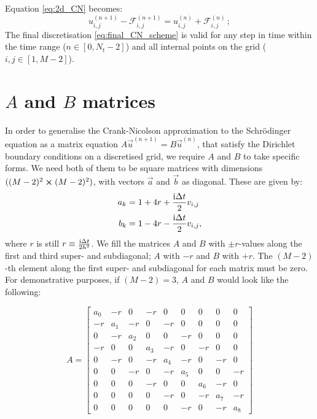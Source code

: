 Equation \eqref{eq:2d_CN} becomes:
\begin{equation}\label{eq:final_CN_scheme}
    u_{i,j}^{(n+1)} - \mathcal{F}_{i,j}^{(n+1)} = u_{i, j}^{(n)} + \mathcal{F}_{i,j}^{(n)} \, ;
\end{equation}
The final discretisation \eqref{eq:final_CN_scheme} is valid for any step in time within the time range ($n\in[0, N_t-2]$) and all internal points on the grid ($i,j \in [1, M-2]$).


\newpage

\section{$A$ and $B$ matrices}\label{app:A_and_B}
    In order to generalise the Crank-Nicolson approximation to the Schrödinger equation as a matrix equation $A\vec{u}^{(n+1)} = B\vec{u}^{(n)}$, that satisfy the Dirichlet boundary conditions on a discretised grid, we require $A$ and $B$ to take specific forms. We need both of them to be square matrices with dimensions $((M-2)^2\cross(M-2)^2)$, with vectors $\vec{a}$ and $\vec{b}$ as diagonal. These are given by:
    \begin{equation}
        \begin{split}
            a_k &= 1+4r +\frac{\mathrm{i}\Delta t}{2}v_{i,j} \\
            b_k &= 1-4r -\frac{\mathrm{i}\Delta t}{2}v_{i,j},
        \end{split}
    \end{equation}
    where $r$ is still $r\equiv \frac{\mathrm{i}\Delta t}{2h^2}$. We fill the matrices $A$ and $B$ with $\pm r$-values along the first and third super- and subdiagonal; $A$ with $-r$ and $B$ with $+r$. The $(M-2)$-th element along the first super- and subdiagonal for each matrix must be zero. For demonstrative purposes, if $(M-2)=3$, $A$ and $B$ would look like the following:

    \begin{equation}
        A = 
        \begin{bmatrix} 
            a_0 & -r  & 0 & -r & 0 & 0 & 0 & 0 & 0 \\
            -r  & a_1 & -r & 0 & -r & 0 & 0 & 0 & 0 \\
             0  & -r  & a_2 & 0 & 0 & -r & 0 & 0 & 0 \\
            -r  & 0   & 0 & a_3 & -r & 0 & -r & 0 & 0 \\
             0  & -r  & 0 & -r & a_4 & -r & 0 & -r & 0 \\ 
             0  & 0   & -r & 0 & -r & a_5 & 0 & 0 & -r \\
             0  & 0   & 0 & -r & 0 & 0 & a_6 & -r & 0 \\
             0  & 0   & 0 & 0 & -r & 0 & -r & a_7 & -r \\
             0  & 0   & 0 & 0 & 0 & -r & 0 & -r & a_8  
        \end{bmatrix}
    \end{equation}

